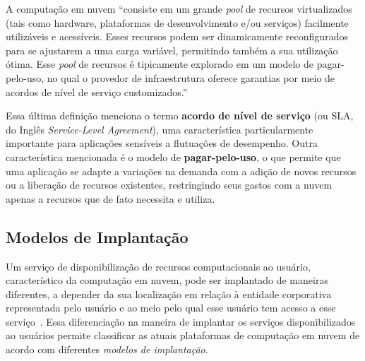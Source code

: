 \begin{citacao}
A computação em nuvem ``consiste em um grande \emph{pool} de recursos virtualizados 
(tais como hardware, plataformas de desenvolvimento e/ou serviços) facilmente 
utilizáveis e acessíveis. Esses recursos podem ser dinamicamente reconfigurados 
para se ajustarem a uma carga variável, permitindo também a sua utilização ótima. 
Esse \emph{pool} de recursos é tipicamente explorado em um modelo de pagar-pelo-uso, 
no qual o provedor de infraestrutura oferece garantias por meio de acordos de nível 
de serviço customizados.''\end{citacao}

Essa última definição menciona o termo \textbf{acordo de nível de serviço} (ou SLA, do Inglês \emph{Service-Level Agreement}), uma característica particularmente importante para aplicações sensíveis a flutuações 
de desempenho. Outra característica mencionada é o modelo de \textbf{pagar-pelo-uso}, 
o que permite que uma aplicação se adapte a variações na demanda com a adição de 
novos recursos ou a liberação de recursos existentes, restringindo seus gastos 
com a nuvem apenas a recursos que de fato necessita e utiliza.

\subsection{Modelos de Implantação}

Um serviço de disponibilização de recursos computacionais ao usuário, característico da computação em nuvem, pode ser implantado de maneiras diferentes,
a depender da sua localização em relação à entidade corporativa representada pelo
usuário e ao meio pelo qual esse usuário tem acesso a esse 
serviço~\cite{armbrust2009above,Zhang2010}. Essa diferenciação na maneira de implantar os serviços disponibilizados ao usuários permite classificar as atuais plataformas de computação em nuvem de acordo com diferentes \emph{modelos de implantação}. 
 
